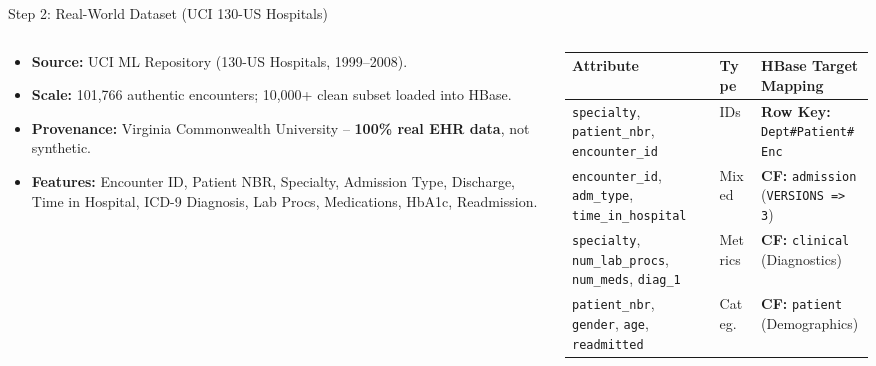 \documentclass[aspectratio=169]{beamer}
\begin{document}
\begin{frame}{Step 2: Real-World Dataset (UCI 130-US Hospitals)}
    \begin{columns}[T]
        \begin{column}{0.40\textwidth}
            \begin{itemize}\scriptsize
                \item \textbf{Source:} UCI ML Repository (130-US Hospitals, 1999--2008).
                \item \textbf{Scale:} 101,766 authentic encounters; 10,000+ clean subset loaded into HBase.
                \item \textbf{Provenance:} Virginia Commonwealth University -- \textbf{100\% real EHR data}, not synthetic.
                \item \textbf{Features:} Encounter ID, Patient NBR, Specialty, Admission Type, Discharge, Time in Hospital, ICD-9 Diagnosis, Lab Procs, Medications, HbA1c, Readmission.
            \end{itemize}
        \end{column}
        \begin{column}{0.57\textwidth}
            \vspace{-0.1cm}
            \begin{table}
                \centering
                \fontsize{5.5}{7}\selectfont
                \begin{tabular}{p{2.8cm}p{1cm}p{4cm}}
                    \toprule
                    \textbf{Attribute} & \textbf{Type} & \textbf{HBase Target Mapping} \\
                    \midrule
                    \texttt{specialty}, \texttt{patient\_nbr}, \texttt{encounter\_id} & IDs & \textbf{Row Key:} \texttt{Dept\#Patient\#Enc} \\
                    \texttt{encounter\_id}, \texttt{adm\_type}, \texttt{time\_in\_hospital} & Mixed & \textbf{CF:} \texttt{admission} (\texttt{VERSIONS => 3}) \\
                    \texttt{specialty}, \texttt{num\_lab\_procs}, \texttt{num\_meds}, \texttt{diag\_1} & Metrics & \textbf{CF:} \texttt{clinical} (Diagnostics) \\
                    \texttt{patient\_nbr}, \texttt{gender}, \texttt{age}, \texttt{readmitted} & Categ. & \textbf{CF:} \texttt{patient} (Demographics) \\
                    \bottomrule
                \end{tabular}
            \end{table}
        \end{column}
    \end{columns}
\end{frame}
\end{document}
